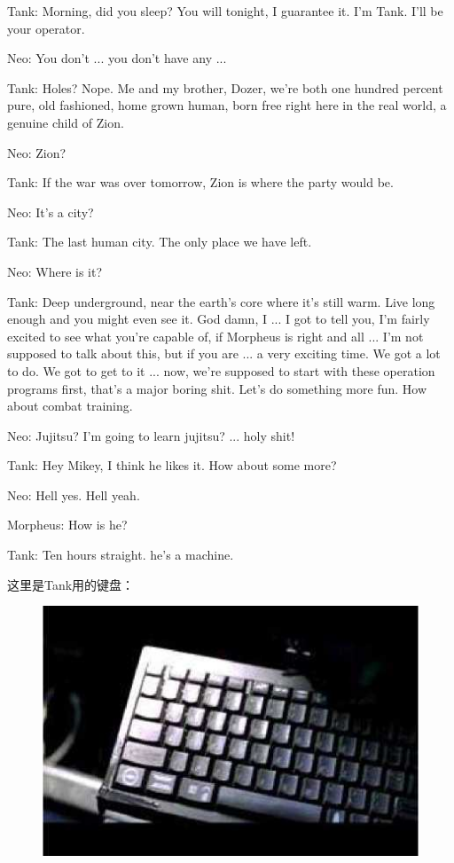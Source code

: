 \documentclass{ctexart}
\newenvironment{myquote}{\color{green} \setlength{\leftskip}{6em} \setlength{\rightskip}{4em} \setlength{\parindent}{-2em}}{\par}
\begin{document}
\begin{myquote}
Tank: Morning, did you sleep? You will tonight, I guarantee it. I'm Tank. I'll be your operator.

Neo: You don't ... you don't have any ...

Tank: Holes? Nope. Me and my brother, Dozer, we're both one hundred percent pure, old fashioned, home grown human, born free right here in the real world, a genuine child of Zion.

Neo: Zion?

Tank: If the war was over tomorrow, Zion is where the party would be.

Neo: It's a city?

Tank: The last human city. The only place we have left.

Neo: Where is it?

Tank: Deep underground, near the earth's core where it's still warm. Live long enough and you might even see it. God damn, I ... I got to tell you, I'm fairly excited to see what you're capable of, if Morpheus is right and all ... I'm not supposed to talk about this, but if you are ... a very exciting time. We got a lot to do. We got to get to it ... now, we're supposed to start with these operation programs first, that's a major boring shit. Let's do something more fun. How about combat training.

Neo: Jujitsu? I'm going to learn jujitsu? ... holy shit!

Tank: Hey Mikey, I think he likes it. How about some more?

Neo: Hell yes. Hell yeah.

Morpheus: How is he?

Tank: Ten hours straight. he's a machine.
\end{myquote}

这里是Tank用的键盘：

\begin{figure}[htb]
\centering
\includegraphics[width=0.5\linewidth]{fig/read_Matrix-30}
\end{figure}
\end{document}
